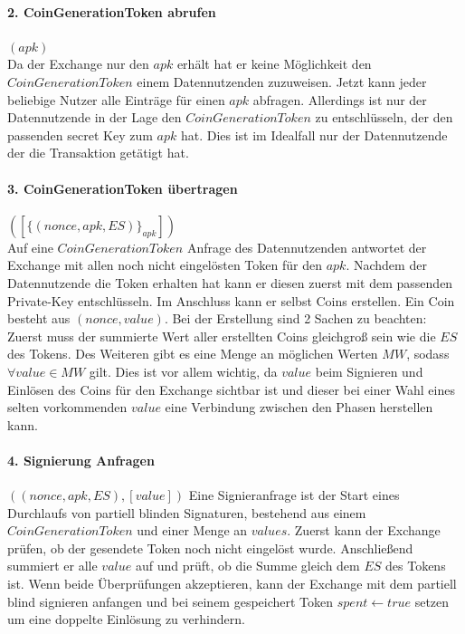 \documentclass[
	fontsize=12pt,
	headings=small,
	parskip=half,           %
	bibliography=totoc,
	numbers=noenddot,       %
	open=any,               %
]{scrreprt}
\begin{document}
\paragraph{2. CoinGenerationToken abrufen} $(apk)$\\
Da der Exchange nur den $apk$ erhält hat er keine Möglichkeit den $CoinGenerationToken$ einem Datennutzenden zuzuweisen. Jetzt kann jeder beliebige Nutzer alle Einträge für einen $apk$ abfragen. Allerdings ist nur der Datennutzende in der Lage den $CoinGenerationToken$ zu entschlüsseln, der den passenden secret Key zum $apk$ hat. Dies ist im Idealfall nur der Datennutzende der die Transaktion getätigt hat.

\paragraph{3. CoinGenerationToken übertragen} $([\{(nonce, apk, ES)\}_{apk}])$\\
Auf eine $CoinGenerationToken$ Anfrage des Datennutzenden antwortet der Exchange mit allen noch nicht eingelösten Token für den $apk$. Nachdem der Datennutzende die Token erhalten hat kann er diesen zuerst mit dem passenden Private-Key entschlüsseln. Im Anschluss kann er selbst Coins erstellen. Ein Coin besteht aus $(nonce, value)$. Bei der Erstellung sind 2 Sachen zu beachten: Zuerst muss der summierte Wert aller erstellten Coins gleichgroß sein wie die $ES$ des Tokens. Des Weiteren gibt es eine Menge an möglichen Werten $MW$, sodass $\forall value\in MW$ gilt. Dies ist vor allem wichtig, da $value$ beim Signieren und Einlösen des Coins für den Exchange sichtbar ist und dieser bei einer Wahl eines selten vorkommenden $value$ eine Verbindung zwischen den Phasen herstellen kann.

\paragraph{4. Signierung Anfragen} $((nonce, apk, ES), [value])$
Eine Signieranfrage ist der Start eines Durchlaufs von partiell blinden Signaturen, bestehend aus einem $CoinGenerationToken$ und einer Menge an $values$. Zuerst kann der Exchange prüfen, ob der gesendete Token noch nicht eingelöst wurde. Anschließend summiert er alle $value$ auf und prüft, ob die Summe gleich dem $ES$ des Tokens ist. Wenn beide Überprüfungen akzeptieren, kann der Exchange mit dem partiell blind signieren anfangen und bei seinem gespeichert Token $spent \leftarrow true$ setzen um eine doppelte Einlösung zu verhindern.
\end{document}
